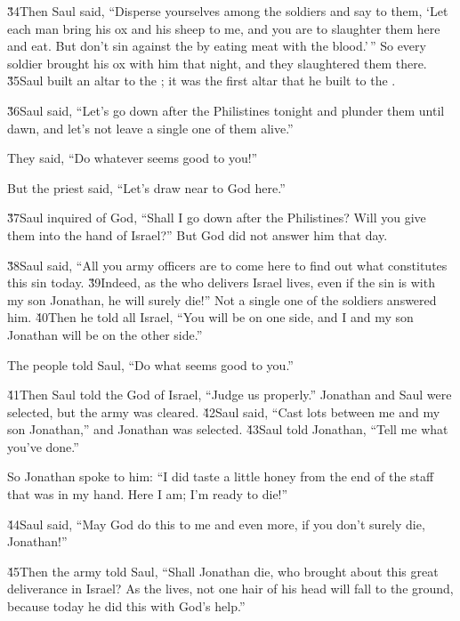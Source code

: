\v{34}Then Saul said, ``Disperse yourselves among the soldiers and say to them, `Let each man bring his ox and his sheep to me, and you are to slaughter them here and eat. But don't sin against the  by eating meat with the blood.'\,'' So every soldier brought his ox with him that night, and they slaughtered them there. \v{35}Saul built an altar to the ; it was the first altar that he built to the .

\v{36}Saul said, ``Let's go down after the Philistines tonight and plunder them until dawn, and let's not leave a single one of them alive.''

They said, ``Do whatever seems good to you!''

But the priest said, ``Let's draw near to God here.''

\v{37}Saul inquired of God, ``Shall I go down after the Philistines? Will you give them into the hand of Israel?'' But God did not answer him that day.

\v{38}Saul said, ``All you army officers are to come here to find out what constitutes this sin today. \v{39}Indeed, as the  who delivers Israel lives, even if the sin is with my son Jonathan, he will surely die!'' Not a single one of the soldiers answered him. \v{40}Then he told all Israel, ``You will be on one side, and I and my son Jonathan will be on the other side.''

The people told Saul, ``Do what seems good to you.''

\v{41}Then Saul told the  God of Israel, ``Judge us properly.'' Jonathan and Saul were selected, but the army was cleared. \v{42}Saul said, ``Cast lots between me and my son Jonathan,'' and Jonathan was selected. \v{43}Saul told Jonathan, ``Tell me what you've done.''

So Jonathan spoke to him: ``I did taste a little honey from the end of the staff that was in my hand. Here I am; I'm ready to die!''

\v{44}Saul said, ``May God do this to me and even more, if you don't surely die, Jonathan!''

\v{45}Then the army told Saul, ``Shall Jonathan die, who brought about this great deliverance in Israel? As the  lives, not one hair of his head will fall to the ground, because today he did this with God's help.''

